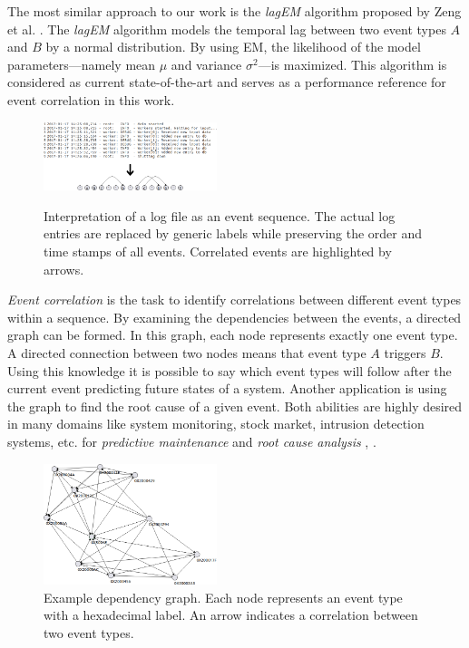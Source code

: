 \documentclass[conference]{IEEEtran}
\theoremstyle{examplestyle}
\begin{document}
The most similar approach to our work is the \textit{lagEM} algorithm proposed by Zeng et al. \cite{Zeng2015}. The \textit{lagEM} algorithm models the temporal lag between two event types \(A\) and \(B\) by a normal distribution. By using \ac{EM}, the likelihood of the model parameters---namely mean \(\mu\) and variance \(\sigma^2\)---is maximized. This algorithm is considered as current state-of-the-art and serves as a performance reference for event correlation in this work.

\begin{figure}[!tb]
	\centering
	{
	\includegraphics[width=0.45\textwidth]{images/overview.png}}
	\caption{Interpretation of a log file as an event sequence. The actual log entries are replaced by generic labels while preserving the order and time stamps of all events. Correlated events are highlighted  by arrows.}
	\label{fig:logToSequence}
\end{figure}


\textit{Event correlation} is the task to identify correlations between different event types within a sequence. By examining the dependencies between the events, a directed graph can be formed. In this graph, each node represents exactly one event type. A directed connection between two nodes means that event type \(A\) triggers \(B\). Using this knowledge it is possible to say which event types will follow after the current event predicting future states of a system. Another application is using the graph to find the root cause of a given event. Both abilities are highly desired in many domains like system monitoring, stock market, intrusion detection systems, etc. for \textit{predictive maintenance} and \textit{root cause analysis} \cite{Zeng2015}, \cite{Benferhat2008}.


\begin{figure}[!tb]
	\centering
	\includegraphics[width=0.45\textwidth]{images/dependency-graph}
	\caption{Example dependency graph. Each node represents an event type with a hexadecimal label. An arrow indicates a  correlation between two event types.}
	\label{fig:exampleDependencyGraph}
\end{figure}
\end{document}

